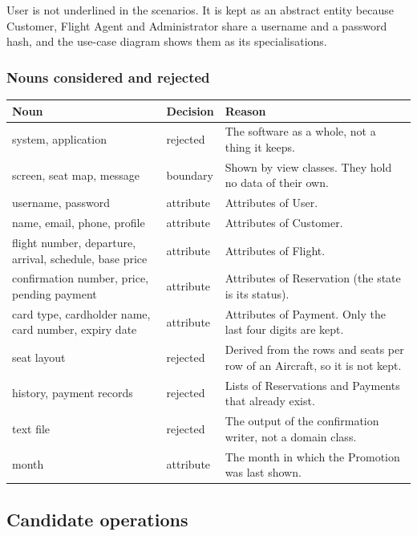 User is not underlined in the scenarios. It is kept as an abstract entity
because Customer, Flight Agent and Administrator share a username and a
password hash, and the use-case diagram shows them as its specialisations.

\subsubsection*{Nouns considered and rejected}

\begingroup
\small
\setlength{\tabcolsep}{4pt}
\begin{longtable}{@{}>{\raggedright\arraybackslash}p{3.0cm}>{\raggedright\arraybackslash}p{2.0cm}>{\raggedright\arraybackslash}p{8.4cm}@{}}
\toprule
\textbf{Noun} & \textbf{Decision} & \textbf{Reason}\\
\midrule
\endhead
system, application & rejected & The software as a whole, not a thing it keeps.\\
screen, seat map, message & boundary & Shown by view classes. They hold no data of their own.\\
username, password & attribute & Attributes of User.\\
name, email, phone, profile & attribute & Attributes of Customer.\\
flight number, departure, arrival, schedule, base price & attribute & Attributes of Flight.\\
confirmation number, price, pending payment & attribute & Attributes of Reservation (the state is its status).\\
card type, cardholder name, card number, expiry date & attribute & Attributes of Payment. Only the last four digits are kept.\\
seat layout & rejected & Derived from the rows and seats per row of an Aircraft, so it is not kept.\\
history, payment records & rejected & Lists of Reservations and Payments that already exist.\\
text file & rejected & The output of the confirmation writer, not a domain class.\\
month & attribute & The month in which the Promotion was last shown.\\
\bottomrule
\end{longtable}
\endgroup

\subsection*{Candidate operations}

